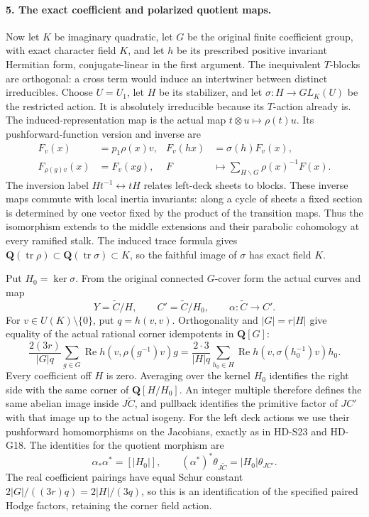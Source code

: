 \paragraph{5. The exact coefficient and polarized quotient maps.}
Now let \(K\) be imaginary quadratic, let \(G\) be the
original finite coefficient group, with exact character field
\(K\), and let \(h\) be its prescribed positive invariant
Hermitian form, conjugate-linear in the first argument.
The inequivalent \(T\)-blocks are orthogonal: a cross term
would induce an intertwiner between distinct irreducibles.
Choose \(U=U_1\), let \(H\) be its stabilizer, and let
\(\sigma:H\to GL_K(U)\) be the restricted action. It is
absolutely irreducible because its \(T\)-action already is.
The induced-representation map is the actual map
\(t\otimes u\mapsto\rho(t)u\). Its pushforward-function
version and inverse are
\[
\begin{aligned}
 F_v(x)&=p_1\rho(x)v,& F_v(hx)&=\sigma(h)F_v(x),\\
 F_{\rho(g)v}(x)&=F_v(xg),&
 F&\longmapsto\sum_{H\backslash G}\rho(x)^{-1}F(x).
\end{aligned}
 \tag{S46.13}
\]
The inversion label \(Ht^{-1}\leftrightarrow tH\) relates
left-deck sheets to blocks. These inverse maps commute with
local inertia invariants: along a cycle of sheets a fixed
section is determined by one vector fixed by the product of
the transition maps. Thus the isomorphism extends to the
middle extensions and their parabolic cohomology at every
ramified stalk. The induced trace formula gives
\(\mathbf Q(\operatorname{tr}\rho)\subset
\mathbf Q(\operatorname{tr}\sigma)\subset K\), so the
faithful image of \(\sigma\) has exact field \(K\).

Put \(H_0=\ker\sigma\). From the original connected
\(G\)-cover form the actual curves and map
\[
 Y=\widetilde C/H,\qquad C'=\widetilde C/H_0,
       \qquad\alpha:\widetilde C\longrightarrow C'.
 \tag{S46.14}
\]
For \(v\in U(K)\setminus\{0\}\), put \(q=h(v,v)\).
Orthogonality and \(|G|=r|H|\) give equality of the actual
rational corner idempotents in \(\mathbf Q[G]\):
\[
 \frac{2(3r)}{|G|q}\sum_{g\in G}
       \operatorname{Re}h(v,\rho(g^{-1})v)g
 =\frac{2\cdot3}{|H|q}\sum_{h_0\in H}
       \operatorname{Re}h(v,\sigma(h_0^{-1})v)h_0.
 \tag{S46.15}
\]
Every coefficient off \(H\) is zero. Averaging over the
kernel \(H_0\) identifies the right side with the same
corner of \(\mathbf Q[H/H_0]\). An integer multiple
therefore defines the same abelian image inside
\(J\widetilde C\), and pullback identifies the primitive
factor of \(JC'\) with that image up to the actual isogeny.
For the left deck actions we use their pushforward homomorphisms
on the Jacobians, exactly as in HD-S23 and HD-G18. The identities
for the quotient morphism are
\[
 \alpha_*\alpha^*=[|H_0|],\qquad
       (\alpha^*)^*\theta_{J\widetilde C}=|H_0|\theta_{JC'}.
 \tag{S46.16}
\]
The real coefficient pairings have equal Schur constant
\(2|G|/((3r)q)=2|H|/(3q)\), so this is an identification
of the specified paired Hodge factors, retaining the corner
field action.


